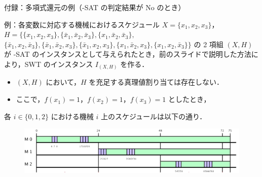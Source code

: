 \documentclass[dvipdfmx]{beamer}
\begin{document}
    \begin{frame}{付録：多項式還元の例（{-SAT} の判定結果が No のとき）}
      \begin{exampleblock}{例：各変数に対応する機械におけるスケジュール}
        $X = \{x_1,x_2,x_3\}$，$H = \big\{
        \{x_1,x_2,x_3\},
        \{\bar x_1,\bar x_2,\bar x_3\},
        \{x_1,\bar x_2,\bar x_3\},$
        \\
        $\{\bar x_1,x_2,\bar x_3\},
        \{\bar x_1,\bar x_2,x_3\},
        \{\bar x_1,x_2,x_3\},
        \{x_1,\bar x_2,x_3\},
        \{x_1,x_2,\bar x_3\}
        \big\}$ の 2 項組 $(X,H)$ が {-SAT} のインスタンスとして与えられたとき，前のスライドで説明した方法により，SWT のインスタンス $I_{(X,H)}$ を作る．
        \begin{itemize}
          \item $(X,H)$ において，$H$ を充足する真理値割り当ては存在しない．
          \item ここで，$f(x_1) = 1$，$f(x_2) = 1$，$f(x_3) = 1$ としたとき，
        \end{itemize}
        各 $i \in \{0,1,2\}$ における機械 $i$ 上のスケジュールは以下の通り．
        \begin{figure}[h]
          \centering
          \includegraphics[width = 12cm]{figure/reductionExample4.pdf}
        \end{figure}
      \end{exampleblock}
    \end{frame}
\end{document}
